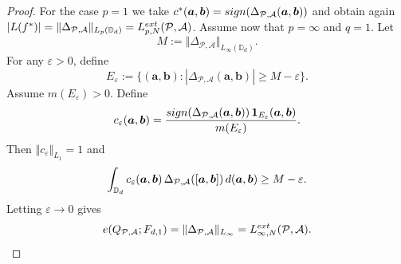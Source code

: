 \documentclass[10pt,a4paper]{amsart}
\newcommand{\D}{\mathbb{D}}
\newcommand{\bsa}{{\boldsymbol a}}
\newcommand{\bsb}{{\boldsymbol b}}
\newcommand{\cA}{\mathcal{A}}
\newcommand{\cP}{\mathcal{P}}
\newcommand{\ex}{{\rm ext}}
\newcommand{\rd}{\,{\rm d}}
\newcommand{\sgn}{{\rm sign}}
\begin{document}
\begin{proof}
For the case $p=1$ we take $c^*(\bsa,\bsb) = \sgn (\Delta_{\cP,\cA} (\bsa,\bsb))$ and obtain 
again $|L(f^\ast)|=\|\Delta_{\cP,\cA}\|_{L_p(\D_d)}=L_{p,N}^{\ex}(\cP,\cA)$.
Assume now that  $p=\infty$ and  $q=1$. Let
\[
M:=\Vert \Delta_{\cP,\cA} \Vert_{L_{\infty}(\D_d)}.
\]
For any $\varepsilon>0$, define
\[
E_\varepsilon
:=\{(\bsa,\bsb): |\Delta_{\cP,\cA}(\bsa,\bsb)| \ge M-\varepsilon\}.
\]
Assume $m(E_\varepsilon)>0$.
Define
\[
c_\varepsilon (\bsa, \bsb) 
=\frac{ \sgn (\Delta_{\cP,\cA} (\bsa, \bsb) )\,  {\mathbf 1}_{E_\varepsilon} (\bsa, \bsb) }{m(E_\varepsilon)}.
\]
Then $\Vert c_\varepsilon\Vert_{L_1}=1$ and
\[
\int_{\D_d}  c_\varepsilon (\bsa,\bsb)\,\Delta_{\cP,\cA}([\bsa,\bsb])\rd (\bsa,\bsb )
\ge M-\varepsilon.
\]
Letting $\varepsilon\to0$ gives
\[
e(Q_{\cP,\cA};F_{d,1})
=\Vert  \Delta_{\cP,\cA}\Vert_{L_\infty}=L_{\infty,N}^{\ex}(\cP,\cA).
\]
\end{proof}
\end{document}
